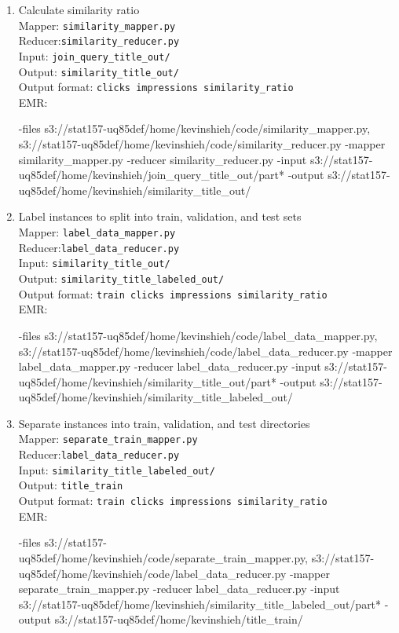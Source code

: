 \documentclass[11pt]{article}
\begin{document}
\begin{enumerate}
\item
Calculate similarity ratio \\
Mapper: \texttt{similarity\_mapper.py} \\
Reducer:\texttt{similarity\_reducer.py} \\
Input: \texttt{join\_query\_title\_out/} \\
Output: \texttt{similarity\_title\_out/} \\
Output format: \texttt{clicks impressions similarity\_ratio} \\
EMR: \begin{spverbatim}
-files s3://stat157-uq85def/home/kevinshieh/code/similarity_mapper.py,
s3://stat157-uq85def/home/kevinshieh/code/similarity_reducer.py 
-mapper similarity_mapper.py -reducer similarity_reducer.py 
-input s3://stat157-uq85def/home/kevinshieh/join_query_title_out/part* 
-output s3://stat157-uq85def/home/kevinshieh/similarity_title_out/
\end{spverbatim}

\item
Label instances to split into train, validation, and test sets \\
Mapper: \texttt{label\_data\_mapper.py} \\
Reducer:\texttt{label\_data\_reducer.py} \\
Input: \texttt{similarity\_title\_out/} \\
Output: \texttt{similarity\_title\_labeled\_out/} \\
Output format: \texttt{train clicks impressions similarity\_ratio} \\
EMR: \begin{spverbatim}
-files s3://stat157-uq85def/home/kevinshieh/code/label_data_mapper.py,
s3://stat157-uq85def/home/kevinshieh/code/label_data_reducer.py 
-mapper label_data_mapper.py -reducer label_data_reducer.py 
-input s3://stat157-uq85def/home/kevinshieh/similarity_title_out/part* 
-output s3://stat157-uq85def/home/kevinshieh/similarity_title_labeled_out/
\end{spverbatim}

\item
Separate instances into train, validation, and test directories \\
Mapper: \texttt{separate\_train\_mapper.py} \\
Reducer:\texttt{label\_data\_reducer.py} \\
Input: \texttt{similarity\_title\_labeled\_out/} \\
Output: \texttt{title\_train} \\
Output format: \texttt{train clicks impressions similarity\_ratio} \\
EMR: \begin{spverbatim}
-files s3://stat157-uq85def/home/kevinshieh/code/separate_train_mapper.py,
s3://stat157-uq85def/home/kevinshieh/code/label_data_reducer.py 
-mapper separate_train_mapper.py -reducer label_data_reducer.py 
-input s3://stat157-uq85def/home/kevinshieh/similarity_title_labeled_out/part* 
-output s3://stat157-uq85def/home/kevinshieh/title_train/
\end{spverbatim}


\end{enumerate}
\end{document}
